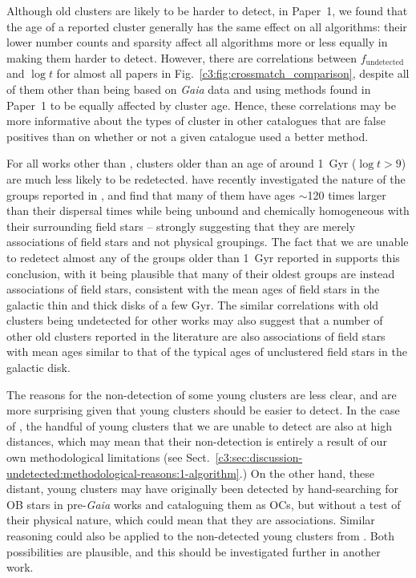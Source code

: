 Although old clusters are likely to be harder to detect, in Paper~1, we found that the age of a reported cluster generally has the same effect on all algorithms: their lower number counts and sparsity affect all algorithms more or less equally in making them harder to detect. However, there are correlations between $f_\text{undetected}$ and $\log t$ for almost all papers in Fig.~\ref{c3:fig:crossmatch_comparison}, despite all of them other than \cite{kharchenko_global_2013} being based on \emph{Gaia} data and using methods found in Paper~1 to be equally affected by cluster age. Hence, these correlations may be more informative about the types of cluster in other catalogues that are false positives than on whether or not a given catalogue used a better method.

For all works other than \cite{cantat-gaudin_clusters_2020}, clusters older than an age of around 1~Gyr ($\log t > 9$) are much less likely to be redetected. \cite{zucker_disconnecting_dots_2022} have recently investigated the nature of the groups reported in \cite{kounkel_untangling_2020}, and find that many of them have ages $\sim$120 times larger than their dispersal times while being unbound and chemically homogeneous with their surrounding field stars -- strongly suggesting that they are merely associations of field stars and not physical groupings. The fact that we are unable to redetect almost any of the groups older than 1~Gyr reported in \cite{kounkel_untangling_2020} supports this conclusion, with it being plausible that many of their oldest groups are instead associations of field stars, consistent with the mean ages of field stars in the galactic thin and thick disks of a few Gyr. The similar correlations with old clusters being undetected for other works may also suggest that a number of other old clusters reported in the literature are also associations of field stars with mean ages similar to that of the typical ages of unclustered field stars in the galactic disk.

The reasons for the non-detection of some young clusters are less clear, and are more surprising given that young clusters should be easier to detect. In the case of \cite{cantat-gaudin_clusters_2020}, the handful of young clusters that we are unable to detect are also at high distances, which may mean that their non-detection is entirely a result of our own methodological limitations (see Sect.~\ref{c3:sec:discussion-undetected:methodological-reasons:1-algorithm}.) On the other hand, these distant, young clusters may have originally been detected by hand-searching for OB stars in pre-\emph{Gaia} works and cataloguing them as OCs, but without a test of their physical nature, which could mean that they are associations. Similar reasoning could also be applied to the non-detected young clusters from \cite{kharchenko_global_2013}. Both possibilities are plausible, and this should be investigated further in another work.

